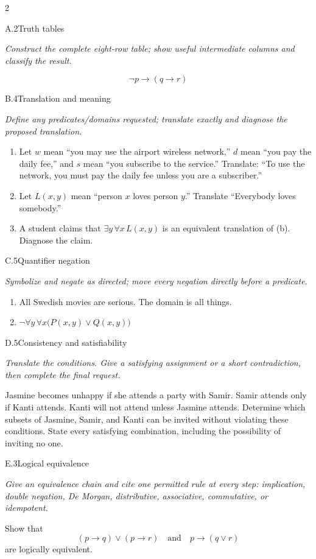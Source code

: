 \documentclass[9pt]{extarticle}
\begin{document}
\begin{multicols}{2}
\begin{CoreProblem}{A.2}{Truth tables}
{\scriptsize\textit{Construct the complete eight-row table; show useful intermediate columns and classify the result.}\par}
\[
  \neg p\to(q\to r)
\]
\end{CoreProblem}
\begin{CoreProblem}{B.4}{Translation and meaning}
{\scriptsize\textit{Define any predicates/domains requested; translate exactly and diagnose the proposed translation.}\par}
\begin{enumerate}[label=(\alph*)]
  \item Let $w$ mean ``you may use the airport wireless network,'' $d$ mean
        ``you pay the daily fee,'' and $s$ mean ``you subscribe to the
        service.'' Translate: ``To use the network, you must pay the daily fee
        unless you are a subscriber.''
  \item Let $L(x,y)$ mean ``person $x$ loves person $y$.'' Translate
        ``Everybody loves somebody.''
  \item A student claims that $\exists y\,\forall x\,L(x,y)$ is an equivalent
        translation of (b). Diagnose the claim.
\end{enumerate}
\end{CoreProblem}
\begin{CoreProblem}{C.5}{Quantifier negation}
{\scriptsize\textit{Symbolize and negate as directed; move every negation directly before a predicate.}\par}
\begin{enumerate}[label=(\alph*)]
  \item All Swedish movies are serious. The domain is all things.
  \item $\neg\forall y\,\forall x\bigl(P(x,y)\lor Q(x,y)\bigr)$
\end{enumerate}
\end{CoreProblem}
\columnbreak
\begin{CoreProblem}{D.5}{Consistency and satisfiability}
{\scriptsize\textit{Translate the conditions. Give a satisfying assignment or a short contradiction, then complete the final request.}\par}
Jasmine becomes unhappy if she attends a party with Samir. Samir attends only
if Kanti attends. Kanti will not attend unless Jasmine attends. Determine which
subsets of Jasmine, Samir, and Kanti can be invited without violating these
conditions. State every satisfying combination, including the possibility of
inviting no one.
\end{CoreProblem}
\begin{CoreProblem}{E.3}{Logical equivalence}
{\scriptsize\textit{Give an equivalence chain and cite one permitted rule at every step: implication, double negation, De Morgan, distributive, associative, commutative, or idempotent.}\par}
Show that
\[
  (p\to q)\lor(p\to r)
  \quad\text{and}\quad
  p\to(q\lor r)
\]
are logically equivalent.
\end{CoreProblem}
\end{multicols}
\end{document}
